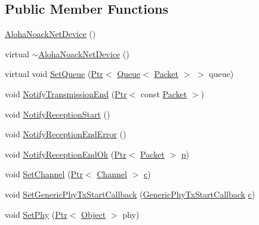 \subsection*{Public Member Functions}
\begin{DoxyCompactItemize}
\item 
\hyperlink{classns3_1_1AlohaNoackNetDevice_abe170e79ce7a7bed6cfaffc16d2be4dd}{Aloha\+Noack\+Net\+Device} ()
\item 
virtual \hyperlink{classns3_1_1AlohaNoackNetDevice_a7aff15fab955bae53e72ca4fc93ef68c}{$\sim$\+Aloha\+Noack\+Net\+Device} ()
\item 
virtual void \hyperlink{classns3_1_1AlohaNoackNetDevice_a12ba47058e485116bcfb00910cb52644}{Set\+Queue} (\hyperlink{classns3_1_1Ptr}{Ptr}$<$ \hyperlink{classns3_1_1Queue}{Queue}$<$ \hyperlink{classns3_1_1Packet}{Packet} $>$ $>$ queue)
\item 
void \hyperlink{classns3_1_1AlohaNoackNetDevice_a7fcff6bdf5cf11f81d22c2ee9e1b1745}{Notify\+Transmission\+End} (\hyperlink{classns3_1_1Ptr}{Ptr}$<$ const \hyperlink{classns3_1_1Packet}{Packet} $>$)
\item 
void \hyperlink{classns3_1_1AlohaNoackNetDevice_a356254832ab880114c98f939f26843a9}{Notify\+Reception\+Start} ()
\item 
void \hyperlink{classns3_1_1AlohaNoackNetDevice_a04ee405a655af571d26d4cec6ff0d7ac}{Notify\+Reception\+End\+Error} ()
\item 
void \hyperlink{classns3_1_1AlohaNoackNetDevice_ad2a4bfeb92d6ad91a5d5c07918902f58}{Notify\+Reception\+End\+Ok} (\hyperlink{classns3_1_1Ptr}{Ptr}$<$ \hyperlink{classns3_1_1Packet}{Packet} $>$ \hyperlink{lte__link__budget__x2__handover__measures_8m_ac9de518908a968428863f829398a4e62}{p})
\item 
void \hyperlink{classns3_1_1AlohaNoackNetDevice_a8270cf5e4326b0a159b4616c2765f0cc}{Set\+Channel} (\hyperlink{classns3_1_1Ptr}{Ptr}$<$ \hyperlink{classns3_1_1Channel}{Channel} $>$ \hyperlink{mmwave_2model_2fading-traces_2fading__trace__generator_8m_ae0323a9039add2978bf5b49550572c7c}{c})
\item 
void \hyperlink{classns3_1_1AlohaNoackNetDevice_a6530cb640d1c4c34d0038a1a6d5287d7}{Set\+Generic\+Phy\+Tx\+Start\+Callback} (\hyperlink{namespacens3_ae7520442eb033588646b0ba04c79bdd8}{Generic\+Phy\+Tx\+Start\+Callback} \hyperlink{mmwave_2model_2fading-traces_2fading__trace__generator_8m_ae0323a9039add2978bf5b49550572c7c}{c})
\item 
void \hyperlink{classns3_1_1AlohaNoackNetDevice_ac8a0d32cb0c1cdfe27091473eccb0396}{Set\+Phy} (\hyperlink{classns3_1_1Ptr}{Ptr}$<$ \hyperlink{classns3_1_1Object}{Object} $>$ phy)

\end{DoxyCompactItemize}
